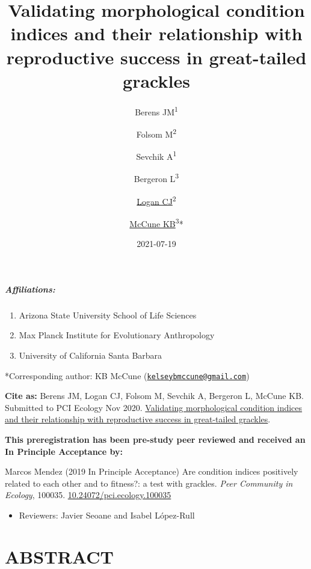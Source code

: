 \documentclass[
]{article}
\title{Validating morphological condition indices and their relationship
with reproductive success in great-tailed grackles}
\author{Berens JM\textsuperscript{1} \and Folsom
M\textsuperscript{2} \and Sevchik A\textsuperscript{1} \and Bergeron
L\textsuperscript{3} \and \href{http://CorinaLogan.com}{Logan
CJ}\textsuperscript{2} \and \href{https://www.kelseymccune.com/}{McCune
KB}\textsuperscript{3}*}
\date{2021-07-19}
\providecommand{\tightlist}{%
  \setlength{\itemsep}{0pt}\setlength{\parskip}{0pt}}
\begin{document}
\maketitle

\hypertarget{affiliations}{%
\subparagraph{Affiliations:}\label{affiliations}}

\begin{enumerate}
\def\labelenumi{\arabic{enumi})}
\tightlist
\item
  Arizona State University School of Life Sciences
\item
  Max Planck Institute for Evolutionary Anthropology
\item
  University of California Santa Barbara
\end{enumerate}

*Corresponding author: KB McCune
(\href{mailto:kelseybmccune@gmail.com}{\nolinkurl{kelseybmccune@gmail.com}})

\textbf{Cite as:} Berens JM, Logan CJ, Folsom M, Sevchik A, Bergeron L,
McCune KB. Submitted to PCI Ecology Nov 2020.
\href{http://corinalogan.com/Preregistrations/gcondition.html}{Validating
morphological condition indices and their relationship with reproductive
success in great-tailed grackles}.

\textbf{This preregistration has been pre-study peer reviewed and
received an In Principle Acceptance by:}

Marcos Mendez (2019 In Principle Acceptance) Are condition indices
positively related to each other and to fitness?: a test with grackles.
\emph{Peer Community in Ecology}, 100035.
\href{https://doi.org/10.24072/pci.ecology.100035}{10.24072/pci.ecology.100035}

\begin{itemize}
\tightlist
\item
  Reviewers: Javier Seoane and Isabel López-Rull
\end{itemize}

\hypertarget{abstract}{%
\section{ABSTRACT}\label{abstract}}
\end{document}
